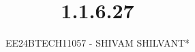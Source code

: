 \documentclass[journal]{IEEEtran}
\begin{document}

\vspace{3cm}

\title{1.1.6.27}
\author{EE24BTECH11057 - SHIVAM SHILVANT*
}
{\let\newpage\relax\maketitle}

\renewcommand{\thefigure}{\theenumi}
\renewcommand{\thetable}{\theenumi}
\setlength{\intextsep}{10pt} %


\renewcommand{\thetable}{\theenumi}
\end{document}
